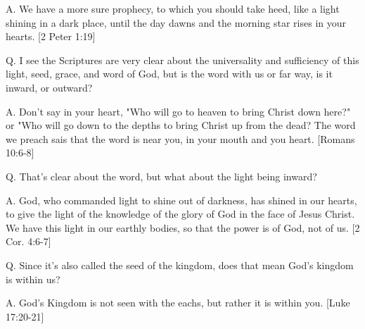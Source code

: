 \documentclass[../main.tex]{subfiles}
\begin{document}
	A. We have a more sure prophecy, to which you should take heed, like a light shining in a dark place, until the day dawns and the morning star rises in your hearts. [2 Peter 1:19]

	Q. I see the Scriptures are very clear about the universality and sufficiency of this light, seed, grace, and word of God, but is the word with us or far way, is it inward, or outward?

	A. Don't say in your heart, "Who will go to heaven to bring Christ down here?" or "Who will go down to the depths to bring Christ up from the dead?  The word we preach sais that the word is near you, in your mouth and you heart. [Romans 10:6-8]

	Q. That's clear about the word, but what about the light being inward?

	A. God, who commanded light to shine out of darkness, has shined in our hearts, to give the light of the knowledge of the glory of God in the face of Jesus Christ. We have this light in our earthly bodies, so that the power is of God, not of us. [2 Cor. 4:6-7]

	Q. Since it's also called the seed of the kingdom, does that mean God's kingdom is within us?

	A. God's Kingdom is not seen with the eachs, but rather it is within you. [Luke 17:20-21]
\end{document}

